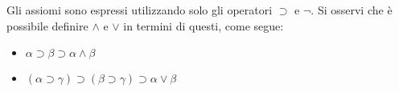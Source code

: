 Gli assiomi sono espressi utilizzando solo gli operatori $\supset$ e $\lnot$. Si osservi che è possibile definire $\land$ e $\lor$ in termini di questi, come segue:
\begin{itemize}
\item $\alpha \supset \beta \supset \alpha \land \beta$
\item $(\alpha \supset \gamma) \supset (\beta \supset \gamma) \supset \alpha \lor \beta$
\end{itemize}

